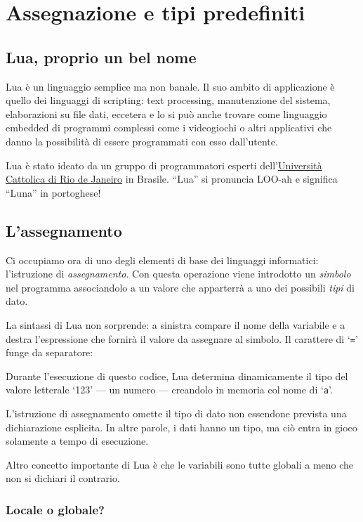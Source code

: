 
\chapter{Assegnazione e tipi predefiniti}
\label{chAssignment}


\section{Lua, proprio un bel nome}

Lua è un linguaggio semplice ma non banale. Il suo ambito di applicazione è
quello dei linguaggi di scripting: text processing, manutenzione del sistema,
elaborazioni su file dati, eccetera e lo si può anche trovare come linguaggio
embedded di programmi complessi come i videogiochi o altri applicativi
che danno la possibilità di essere programmati con esso dall'utente.

Lua è stato ideato da un gruppo di programmatori esperti
dell'\href{http://www.puc-rio.br/index.html}{Università Cattolica di Rio de
Janeiro} in Brasile. ``Lua'' si pronuncia LOO-ah e significa ``Luna'' in
portoghese!


\section{L'assegnamento}

Ci occupiamo ora di uno degli elementi di base dei linguaggi informatici:
l'istruzione di \emph{assegnamento}. Con questa operazione viene introdotto un
\emph{simbolo} nel programma associandolo a un valore che apparterrà a uno
dei possibili \emph{tipi} di dato.

La sintassi di Lua non sorprende: a sinistra compare il nome della variabile e
a destra l'espressione che fornirà il valore da assegnare al simbolo. Il
carattere di `\texttt{=}' funge da separatore:

Durante l'esecuzione di questo codice, Lua determina dinamicamente il tipo del
valore letterale `123' --- un numero --- creandolo in memoria col nome di
`\texttt{a}'.

L'istruzione di assegnamento omette il tipo di dato non essendone prevista una
dichiarazione esplicita. In altre parole, i dati hanno un tipo, ma ciò entra in
gioco solamente a tempo di esecuzione.

Altro concetto importante di Lua è che le variabili sono tutte globali a meno
che non si dichiari il contrario.


\subsection{Locale o globale?}

